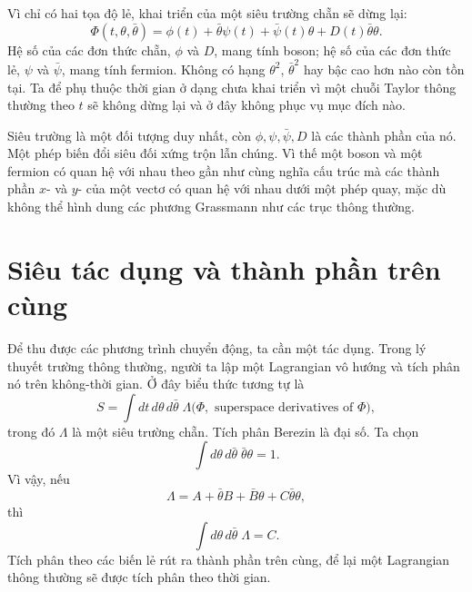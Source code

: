 Vì chỉ có hai tọa độ lẻ, khai triển của một siêu trường chẵn sẽ dừng lại:
\begin{equation}
\Phi(t,\theta,\bar\theta)
=\phi(t)+\bar\theta\psi(t)+\bar\psi(t)\theta
+D(t)\bar\theta\theta.
\label{eq:l7-superfield}
\end{equation}
Hệ số của các đơn thức chẵn, \(\phi\) và \(D\), mang tính boson; hệ số của các đơn thức lẻ, \(\psi\) và \(\bar\psi\), mang tính fermion. Không có hạng \(\theta^2\), \(\bar\theta^2\) hay bậc cao hơn nào còn tồn tại. Ta để phụ thuộc thời gian ở dạng chưa khai triển vì một chuỗi Taylor thông thường theo \(t\) sẽ không dừng lại và ở đây không phục vụ mục đích nào.

\begin{classroomqa}
\end{classroomqa}

Siêu trường là một đối tượng duy nhất, còn \(\phi,\psi,\bar\psi,D\) là các thành phần của nó. Một phép biến đổi siêu đối xứng trộn lẫn chúng. Vì thế một boson và một fermion có quan hệ với nhau theo gần như cùng nghĩa cấu trúc mà các thành phần \(x\)- và \(y\)- của một vectơ có quan hệ với nhau dưới một phép quay, mặc dù không thể hình dung các phương Grassmann như các trục thông thường.

\section{Siêu tác dụng và thành phần trên cùng}

Để thu được các phương trình chuyển động, ta cần một tác dụng. Trong lý thuyết trường thông thường, người ta lập một Lagrangian vô hướng và tích phân nó trên không-thời gian. Ở đây biểu thức tương tự là
\begin{equation}
S=\int dt\,d\theta\,d\bar\theta\;\Lambda
\bigl(\Phi,\text{ superspace derivatives of }\Phi\bigr),
\label{eq:l7-superaction}
\end{equation}
trong đó \(\Lambda\) là một siêu trường chẵn. Tích phân Berezin là đại số. Ta chọn
\begin{equation}
\int d\theta\,d\bar\theta\;\bar\theta\theta=1.
\end{equation}
Vì vậy, nếu
\begin{equation}
\Lambda=A+\bar\theta B+\bar B\theta+C\bar\theta\theta,
\end{equation}
thì
\begin{equation}
\int d\theta\,d\bar\theta\;\Lambda=C.
\label{eq:l7-top-component}
\end{equation}
Tích phân theo các biến lẻ rút ra thành phần trên cùng, để lại một Lagrangian thông thường sẽ được tích phân theo thời gian.

